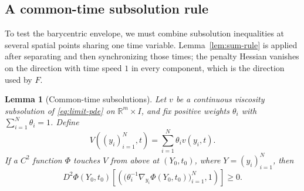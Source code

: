 \documentclass[11pt]{article}
\numberwithin{equation}{section}
\newtheorem{lemma}[theorem]{Lemma}
\theoremstyle{definition}
\theoremstyle{remark}
\newcommand{\R}{\mathbb{R}}
\begin{document}
\subsection{A common-time subsolution rule}

To test the barycentric envelope, we must combine subsolution inequalities
at several spatial points sharing one time variable. Lemma~\ref{lem:sum-rule} is
applied after separating and then synchronizing those times; the penalty
Hessian vanishes on the direction with time speed $1$ in every component,
which is the direction used by $F$.

\begin{lemma}[Common-time subsolutions]\label{lem:common-time-subsolution}
Let $v$ be a continuous viscosity subsolution of
\eqref{eq:limit-pde} on $\R^m\times I$, and fix positive weights
$\theta_i$ with $\sum_{i=1}^N\theta_i=1$. Define
\[
  V((y_i)_{i=1}^N,t)=\sum_{i=1}^N\theta_i v(y_i,t).
\]
If a $C^2$ function $\Phi$ touches $V$ from above at $(Y_0,t_0)$,
where $Y=(y_i)_{i=1}^N$, then
\begin{equation}\label{eq:common-time-inequality}
  D^2\Phi(Y_0,t_0)
   \left[\left(
       \bigl(\theta_i^{-1}\nabla_{y_i}\Phi(Y_0,t_0)\bigr)_{i=1}^N,
       1\right)\right]\ge0.
\end{equation}
\end{lemma}
\end{document}
